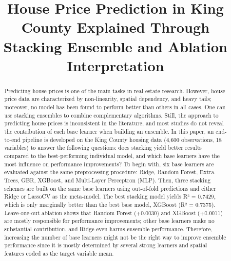 \documentclass[conference]{IEEEtran}
\begin{document}
\title{House Price Prediction in King County Explained Through Stacking Ensemble and Ablation Interpretation}

\author{
}

\maketitle

\begin{abstract}
Predicting house prices is one of the main tasks in real estate research. However, house price data are characterized by non-linearity, spatial dependency, and heavy tails; moreover, no model has been found to perform better than others in all cases. One can use stacking ensembles to combine complementary algorithms. Still, the approach to predicting house prices is inconsistent in the literature, and most studies do not reveal the contribution of each base learner when building an ensemble. In this paper, an end-to-end pipeline is developed on the King County housing data (4,600 observations, 18 variables) to answer the following questions: does stacking yield better results compared to the best-performing individual model, and which base learners have the most influence on performance improvements? To begin with, six base learners are evaluated against the same preprocessing procedure: Ridge, Random Forest, Extra Trees, GBR, XGBoost, and Multi-Layer Perceptron (MLP). Then, three stacking schemes are built on the same base learners using out-of-fold predictions and either Ridge or LassoCV as the meta-model. The best stacking model yields R² = 0.7429, which is only marginally better than the best base model, XGBoost (R² = 0.7375). Leave-one-out ablation shows that Random Forest (+0.0030) and XGBoost (+0.0011) are mostly responsible for performance improvements; other base learners make no substantial contribution, and Ridge even harms ensemble performance. Therefore, increasing the number of base learners might not be the right way to improve ensemble performance since it is mostly determined by several strong learners and spatial features coded as the target variable mean.
\end{abstract}
\end{document}
